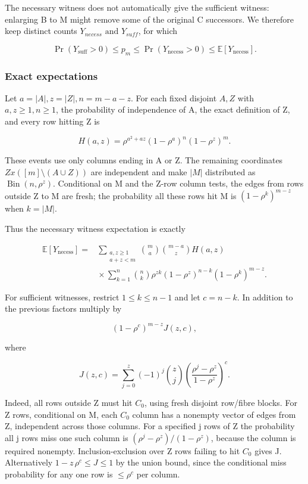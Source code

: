 \documentclass[11pt]{article}
\begin{document}
The necessary witness does not automatically give the sufficient witness: enlarging B to M might remove some of the original C successors. We therefore keep distinct counts $Y_{necess} \text{ and } Y_{suff}$, for which

\[
\Pr(Y_{\mathrm{suff}}>0)\leq p_m\leq\Pr(Y_{\mathrm{necess}}>0)\leq\mathbb E[Y_{\mathrm{necess}}].
\]

\subsubsection{Exact expectations}

Let $a=|A|, z=|Z|, n=m-a-z$. For each fixed disjoint $A,Z$ with $a,z\geq 1, n\geq 1$, the probability of independence of A, the exact definition of Z, and every row hitting Z is

\[
H(a,z)=\rho^{a^2+az}(1-\rho^a)^n(1-\rho^z)^m.
\]

These events use only columns ending in A or Z. The remaining coordinates $Z x ([m] \setminus  (A \cup  Z))$ are independent and make $|M|$ distributed as $\operatorname{Bin}(n,\rho ^{z})$. Conditional on M and the Z-row column tests, the edges from rows outside Z to M are fresh; the probability all these rows hit M is $(1-\rho ^{k})^{m-z}$ when $k=|M|$.

Thus the necessary witness expectation is exactly

\[
\begin{aligned}
\mathbb E[Y_{\mathrm{necess}}]
={}&\sum_{\substack{a,z\geq1\\a+z<m}}\binom ma\binom{m-a}{z}H(a,z)\\
&{}\times\sum_{k=1}^n\binom nk\rho^{zk}(1-\rho^z)^{n-k}(1-\rho^k)^{m-z}.
\end{aligned}
\]

For sufficient witnesses, restrict $1\leq k\leq n-1$ and let $c=n-k$. In addition to the previous factors multiply by

\[
(1-\rho^c)^{m-z}J(z,c),
\]

where

\[
J(z,c)=\sum_{j=0}^{z}(-1)^j\binom zj
\left(\frac{\rho^j-\rho^z}{1-\rho^z}\right)^c.
\]

Indeed, all rows outside Z must hit $C_{0}$, using fresh disjoint row/fibre blocks. For Z rows, conditional on M, each $C_{0}$ column has a nonempty vector of edges from Z, independent across those columns. For a specified j rows of Z the probability all j rows miss one such column is $(\rho ^{j}-\rho ^{z})/(1-\rho ^{z})$, because the column is required nonempty. Inclusion-exclusion over Z rows failing to hit $C_{0}$ gives J. Alternatively $1-z\,\rho ^{c}\leq J\leq 1$ by the union bound, since the conditional miss probability for any one row is $\leq \rho ^{c}$ per column.
\end{document}
